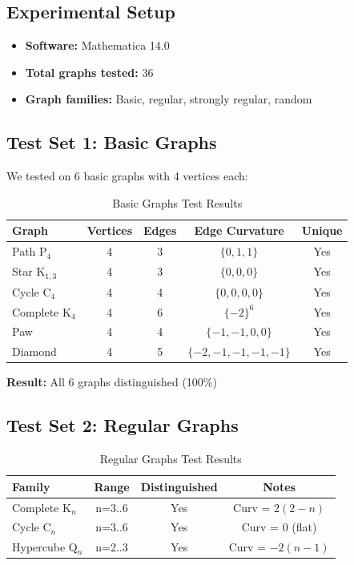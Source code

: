 \documentclass[12pt,a4paper]{article}
\begin{document}
\subsection{Experimental Setup}

\begin{itemize}
  \item \textbf{Software:} Mathematica 14.0
  \item \textbf{Total graphs tested:} 36
  \item \textbf{Graph families:} Basic, regular, strongly regular, random
\end{itemize}

\subsection{Test Set 1: Basic Graphs}

We tested on 6 basic graphs with 4 vertices each:

\begin{table}[h]
\centering
\caption{Basic Graphs Test Results}
\label{tab:basic}
\begin{tabular}{lcccc}
\toprule
Graph & Vertices & Edges & Edge Curvature & Unique \\
\midrule
Path P$_4$ & 4 & 3 & $\{0,1,1\}$ & Yes \\
Star K$_{1,3}$ & 4 & 3 & $\{0,0,0\}$ & Yes \\
Cycle C$_4$ & 4 & 4 & $\{0,0,0,0\}$ & Yes \\
Complete K$_4$ & 4 & 6 & $\{-2\}^6$ & Yes \\
Paw & 4 & 4 & $\{-1,-1,0,0\}$ & Yes \\
Diamond & 4 & 5 & $\{-2,-1,-1,-1,-1\}$ & Yes \\
\bottomrule
\end{tabular}
\end{table}

\textbf{Result:} All 6 graphs distinguished (100\%)

\subsection{Test Set 2: Regular Graphs}

\begin{table}[h]
\centering
\caption{Regular Graphs Test Results}
\label{tab:regular}
\begin{tabular}{lccc}
\toprule
Family & Range & Distinguished & Notes \\
\midrule
Complete K$_n$ & n=3..6 & Yes & Curv = $2(2-n)$ \\
Cycle C$_n$ & n=3..6 & Yes & Curv = 0 (flat) \\
Hypercube Q$_n$ & n=2..3 & Yes & Curv = $-2(n-1)$ \\
\bottomrule
\end{tabular}
\end{table}
\end{document}
